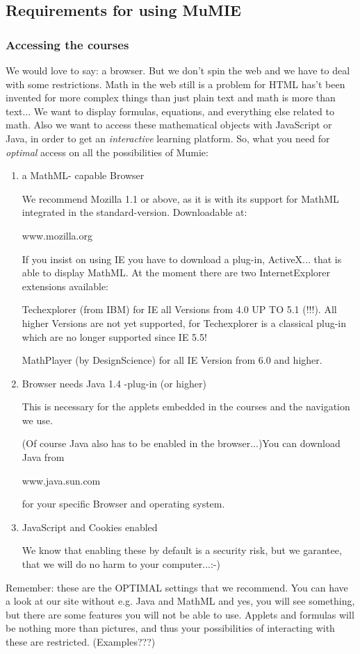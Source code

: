 \documentclass{webpage}
\begin{document}
\subsection{Requirements for using MuMIE}

\subsubsection{Accessing the courses}
We would love to say: a browser. But we don't spin the web and we have to deal with some 
restrictions. Math in the web still is a problem for HTML has't been invented for more complex
things than just plain text and math is more than text... We want to display formulas, equations,
and everything else related to math. Also we want to access these mathematical objects with 
JavaScript or Java, in order to get an \emph{ interactive} learning platform. So, what you need 
for \emph{ optimal} access on all the possibilities of Mumie:

\begin{enumerate}
\item a MathML- capable Browser

We recommend Mozilla 1.1 or above, as it is  with its support for MathML integrated in the
standard-version. Downloadable at: 

www.mozilla.org

If you insist on using IE you have to download a plug-in, ActiveX... that is able to display
MathML. At the moment there are two InternetExplorer extensions available:

Techexplorer (from IBM) for IE all Versions from 4.0 UP TO 5.1 (!!!). All higher Versions are not 
yet supported, for Techexplorer is a classical plug-in which are no longer supported since IE 5.5!

MathPlayer (by DesignScience) for all IE Version from 6.0 and higher.
\item Browser needs Java 1.4 -plug-in (or higher)

This is necessary for the applets embedded in the courses and the navigation we use.

(Of course Java also has to be enabled in the browser...)You can download Java from

www.java.sun.com

for your specific Browser and operating system.
\item JavaScript and Cookies enabled

We know that enabling these by default is a security risk, but we garantee, that we will do no
harm to your computer...:-)

\end{enumerate}
Remember: these are the OPTIMAL settings that we recommend. You can have a look at our site without 
e.g. Java and MathML and yes, you will see something, but there are some features you will not be 
able to use. Applets and formulas will be nothing more than pictures, and thus your possibilities of 
interacting with these are restricted. (Examples???)
\end{document}
